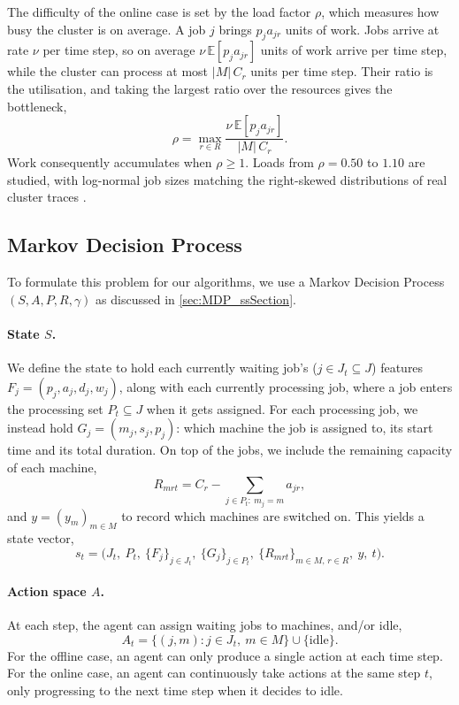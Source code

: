\documentclass[12pt]{article}
\begin{document}
The difficulty of the online case is set by the load factor $\rho$, which measures how busy the cluster is on average. A job $j$ brings $p_j a_{jr}$ units of work. Jobs arrive at rate $\nu$ per time step, so on average $\nu\,\mathbb{E}[p_j a_{jr}]$ units of work arrive per time step, while the cluster can process at most $|M|\, C_r$ units per time step. Their ratio is the utilisation, and taking the largest ratio over the resources gives the bottleneck,
\begin{equation}\label{eq:rho}
    \rho = \max_{r \in R} \frac{\nu\, \mathbb{E}[p_j a_{jr}]}{|M|\, C_r}.
\end{equation}
Work consequently accumulates when $\rho \ge 1$. Loads from $\rho = 0.50$ to $1.10$ are studied, with log-normal job sizes matching the right-skewed distributions of real cluster traces \cite{reiss2012googletrace, cortez2017resourcecentral}.

\subsection{Markov Decision Process}\label{sec:mdp}
To formulate this problem for our algorithms, we use a Markov Decision Process $(S, A, P, R, \gamma)$ as discussed in \cref{sec:MDP_ssSection}.

\paragraph{State $S$.} We define the state to hold each currently waiting job's ($j \in J_t \subseteq J$) features $F_j = (p_j, a_j, d_j, w_j)$, along with each currently processing job, where a job enters the processing set $P_t \subseteq J$ when it gets assigned. For each processing job, we instead hold $G_j = (m_j, s_j, p_j)$: which machine the job is assigned to, its start time and its total duration. On top of the jobs, we include the remaining capacity of each machine,
\begin{equation}\label{eq:remaining-capacity}
    R_{mrt} = C_r - \sum_{j \in P_t:\ m_j = m} a_{jr},
\end{equation}
and $y = (y_m)_{m \in M}$ to record which machines are switched on. This yields a state vector,
\begin{equation}\label{eq:state}
    s_t = \big(J_t,\ P_t,\ \{F_j\}_{j \in J_t},\ \{G_j\}_{j \in P_t},\ \{R_{mrt}\}_{m \in M,\, r \in R},\ y,\ t\big).
\end{equation}

\paragraph{Action space $A$.} At each step, the agent can assign waiting jobs to machines, and/or idle,
\begin{equation}\label{eq:action-flat}
    A_t = \{(j, m) : j \in J_t,\ m \in M\} \cup \{\text{idle}\}.
\end{equation}
For the offline case, an agent can only produce a single action at each time step. For the online case, an agent can continuously take actions at the same step $t$, only progressing to the next time step when it decides to idle.
\end{document}
